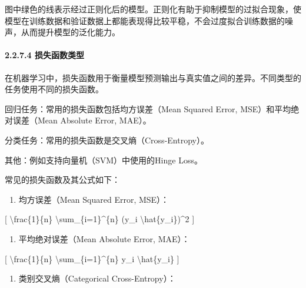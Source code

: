 图中绿色的线表示经过正则化后的模型。正则化有助于抑制模型的过拟合现象，使模型在训练数据和验证数据上都能表现得比较平稳，不会过度拟合训练数据的噪声，从而提升模型的泛化能力。


\paragraph{\texorpdfstring{\textbf{2.2.7.4
损失函数类型}}{2.2.7.4 损失函数类型}}\label{2274-ux635fux5931ux51fdux6570ux7c7bux578b}

在机器学习中，损失函数用于衡量模型预测输出与真实值之间的差异。不同类型的任务使用不同的损失函数。

回归任务：常用的损失函数包括均方误差（Mean Squared Error,
MSE）和平均绝对误差（Mean Absolute Error, MAE）。

分类任务：常用的损失函数是交叉熵（Cross-Entropy）。

其他：例如支持向量机（SVM）中使用的Hinge Loss。

常见的损失函数及其公式如下：

\begin{enumerate}
\def\labelenumi{\arabic{enumi}.}
\item
  均方误差（Mean Squared Error, MSE）：
\end{enumerate}

{[} \textbackslash frac\{1\}\{n\} \textbackslash sum\_\{i=1\}\^{}\{n\}
(y\_i \textbackslash hat\{y\_i\})\^{}2 {]}


\begin{enumerate}
\def\labelenumi{\arabic{enumi}.}
\item
  平均绝对误差（Mean Absolute Error, MAE）：
\end{enumerate}

{[} \textbackslash frac\{1\}\{n\} \textbackslash sum\_\{i=1\}\^{}\{n\}
\textbar y\_i \textbackslash hat\{y\_i\}\textbar{} {]}


\begin{enumerate}
\def\labelenumi{\arabic{enumi}.}
\item
  类别交叉熵（Categorical Cross-Entropy）：
\end{enumerate}


